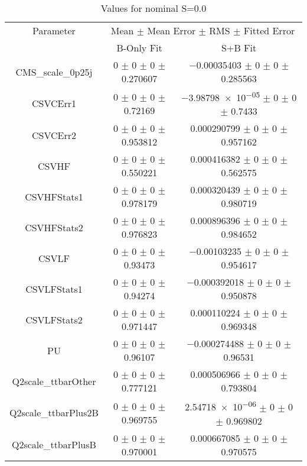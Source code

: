 \begin{table}
\centering
\caption{Values for nominal S=0.0}
\begin{tabular}{ccc}
\toprule
Parameter & \multicolumn{2}{c}{Mean $\pm$ Mean Error $\pm$ RMS $\pm$ Fitted Error}\\
 & B-Only Fit & S+B Fit\\
\midrule
CMS\_scale\_0p25j & \num{0} $\pm$ \num{0} $\pm$ \num{0} $\pm$ \num{0.270607} & \num{-0.00035403} $\pm$ \num{0} $\pm$ \num{0} $\pm$ \num{0.285563}\\
CSVCErr1 & \num{0} $\pm$ \num{0} $\pm$ \num{0} $\pm$ \num{0.72169} & \num{-3.98798e-05} $\pm$ \num{0} $\pm$ \num{0} $\pm$ \num{0.7433}\\
CSVCErr2 & \num{0} $\pm$ \num{0} $\pm$ \num{0} $\pm$ \num{0.953812} & \num{0.000290799} $\pm$ \num{0} $\pm$ \num{0} $\pm$ \num{0.957162}\\
CSVHF & \num{0} $\pm$ \num{0} $\pm$ \num{0} $\pm$ \num{0.550221} & \num{0.000416382} $\pm$ \num{0} $\pm$ \num{0} $\pm$ \num{0.562575}\\
CSVHFStats1 & \num{0} $\pm$ \num{0} $\pm$ \num{0} $\pm$ \num{0.978179} & \num{0.000320439} $\pm$ \num{0} $\pm$ \num{0} $\pm$ \num{0.980719}\\
CSVHFStats2 & \num{0} $\pm$ \num{0} $\pm$ \num{0} $\pm$ \num{0.976823} & \num{0.000896396} $\pm$ \num{0} $\pm$ \num{0} $\pm$ \num{0.984652}\\
CSVLF & \num{0} $\pm$ \num{0} $\pm$ \num{0} $\pm$ \num{0.93473} & \num{-0.00103235} $\pm$ \num{0} $\pm$ \num{0} $\pm$ \num{0.954617}\\
CSVLFStats1 & \num{0} $\pm$ \num{0} $\pm$ \num{0} $\pm$ \num{0.94274} & \num{-0.000392018} $\pm$ \num{0} $\pm$ \num{0} $\pm$ \num{0.950878}\\
CSVLFStats2 & \num{0} $\pm$ \num{0} $\pm$ \num{0} $\pm$ \num{0.971447} & \num{0.000110224} $\pm$ \num{0} $\pm$ \num{0} $\pm$ \num{0.969348}\\
PU & \num{0} $\pm$ \num{0} $\pm$ \num{0} $\pm$ \num{0.96107} & \num{-0.000274488} $\pm$ \num{0} $\pm$ \num{0} $\pm$ \num{0.96531}\\
Q2scale\_ttbarOther & \num{0} $\pm$ \num{0} $\pm$ \num{0} $\pm$ \num{0.777121} & \num{0.000506966} $\pm$ \num{0} $\pm$ \num{0} $\pm$ \num{0.793804}\\
Q2scale\_ttbarPlus2B & \num{0} $\pm$ \num{0} $\pm$ \num{0} $\pm$ \num{0.969755} & \num{2.54718e-06} $\pm$ \num{0} $\pm$ \num{0} $\pm$ \num{0.969802}\\
Q2scale\_ttbarPlusB & \num{0} $\pm$ \num{0} $\pm$ \num{0} $\pm$ \num{0.970001} & \num{0.000667085} $\pm$ \num{0} $\pm$ \num{0} $\pm$ \num{0.970575}\\

\end{tabular}
\end{table}
